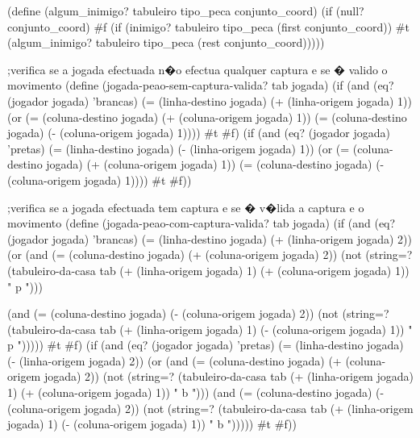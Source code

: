 (define (algum_inimigo? tabuleiro tipo_peca conjunto_coord)
    (if (null? conjunto_coord)
        #f
        (if (inimigo? tabuleiro tipo_peca (first conjunto_coord))
            #t
            (algum_inimigo? tabuleiro tipo_peca (rest conjunto_coord)))))



;verifica se a jogada efectuada n�o efectua qualquer captura e se � valido o movimento
(define (jogada-peao-sem-captura-valida? tab jogada)
  (if (and (eq? (jogador jogada) 'brancas)
           (= (linha-destino jogada)
              (+ (linha-origem jogada) 1))
           (or (= (coluna-destino jogada)
                  (+ (coluna-origem jogada) 1))
               (= (coluna-destino jogada)
                  (- (coluna-origem jogada) 1))))
      #t
      #f)
  (if (and (eq? (jogador jogada) 'pretas)
           (= (linha-destino jogada)
              (- (linha-origem jogada) 1))
           (or (= (coluna-destino jogada)
                  (+ (coluna-origem jogada) 1))
               (= (coluna-destino jogada)
                  (- (coluna-origem jogada) 1))))
      #t
      #f))

      ;verifica se a jogada efectuada tem captura e se � v�lida a captura e o movimento
      (define (jogada-peao-com-captura-valida? tab jogada)
        (if (and (eq? (jogador jogada) 'brancas)
                 (= (linha-destino jogada)
                    (+ (linha-origem jogada) 2))
                 (or (and (= (coluna-destino jogada)
                             (+ (coluna-origem jogada) 2))
                          (not (string=? (tabuleiro-da-casa tab (+ (linha-origem jogada) 1) (+ (coluna-origem jogada) 1))
                                         " p ")))

                     (and (= (coluna-destino jogada)
                             (- (coluna-origem jogada) 2))
                          (not (string=? (tabuleiro-da-casa tab (+ (linha-origem jogada) 1) (- (coluna-origem jogada) 1))
                                         " p ")))))
            #t
            #f)
        (if (and (eq? (jogador jogada) 'pretas)
                 (= (linha-destino jogada)
                    (- (linha-origem jogada) 2))
                 (or (and (= (coluna-destino jogada)
                             (+ (coluna-origem jogada) 2))
                          (not (string=? (tabuleiro-da-casa tab (+ (linha-origem jogada) 1) (+ (coluna-origem jogada) 1))
                                         " b ")))
                     (and (= (coluna-destino jogada)
                             (- (coluna-origem jogada) 2))
                          (not (string=? (tabuleiro-da-casa tab (+ (linha-origem jogada) 1) (- (coluna-origem jogada) 1))
                                         " b ")))))
            #t
            #f))
